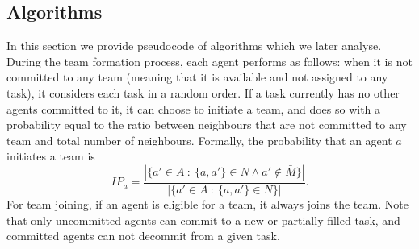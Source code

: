 \documentclass{llncs}
\begin{document}
\subsection{Algorithms}

In this section we provide pseudocode of algorithms which we later analyse. During the team formation process, each agent performs as follows:
when it is not committed to any team (meaning that it is available and not assigned to any task), it considers each task in a random order. If a task currently
has no other agents committed to it, it can choose to initiate a team, and does so with a probability equal to the ratio between neighbours that are not committed to any team and total number of neighbours. Formally, the probability that an agent $a$ initiates a team is
\begin{equation}
IP_a = \frac{|\{ a' \in A\ :\ \{a, a'\} \in N \wedge a' \notin \bar{M}  \}|}{|\{ a' \in A\ :\ \{a, a'\} \in N \}|}.
\label{eq:init_prob}
\end{equation}
For team joining, if an agent is eligible for a team, it always joins the team. Note that only uncommitted agents can commit to
a new or partially filled task, and committed agents can not decommit from a given task.
%

\end{document}
